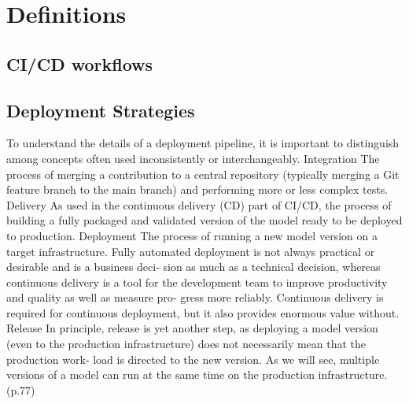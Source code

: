 \section{Definitions}\label{sec:stdefinitions}
\subsection{CI/CD workflows}

\subsection{Deployment Strategies}

To understand the details of a deployment pipeline, it is important to distinguish
among concepts often used inconsistently or interchangeably.
Integration
The process of merging a contribution to a central repository (typically merging
a Git feature branch to the main branch) and performing more or less complex
tests.
Delivery
As used in the continuous delivery (CD) part of CI/CD, the process of building a
fully packaged and validated version of the model ready to be deployed to
production.
Deployment
The process of running a new model version on a target infrastructure. Fully
automated deployment is not always practical or desirable and is a business deci‐
sion as much as a technical decision, whereas continuous delivery is a tool for the
development team to improve productivity and quality as well as measure pro‐
gress more reliably. Continuous delivery is required for continuous deployment,
but it also provides enormous value without.
Release
In principle, release is yet another step, as deploying a model version (even to the
production infrastructure) does not necessarily mean that the production work‐
load is directed to the new version. As we will see, multiple versions of a model
can run at the same time on the production infrastructure.\cite{treveil2020introducing}(p.77)
